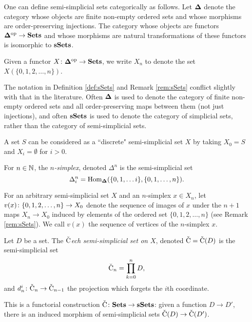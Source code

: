 \documentclass{amsart}
\def\Cech{$\check{\tn{C}}$ech }
\def\C{\check{\tn{C}}}
\begin{document}
\begin{remark}\label{rem:sSets}

One can define semi-simplicial sets categorically as follows.  Let $\bf{\Delta}$ denote the category whose objects are finite non-empty ordered sets and whose morphisms are order-preserving injections.  The category whose objects are functors $\bf{\Delta}^\textnormal{op}\rightarrow{\bf Sets}$ and whose morphisms are natural transformations of these functors is isomorphic to ${\bf sSets}$.

Given a functor $X\colon\bf{\Delta}^\textnormal{op}\rightarrow{\bf Sets}$, we write $X_n$ to denote the set $X(\{0,1,2,\ldots,n\})$.

\end{remark}

\begin{remark}

The notation in Definition \ref{def:sSets} and Remark \ref{rem:sSets} conflict slightly with that in the literature.  Often $\bf{\Delta}$ is used to denote the category of finite non-empty ordered sets and all order-preserving maps between them (not just injections), and often ${\bf sSets}$ is used to denote the category of simplicial sets, rather than the category of semi-simplicial sets.  

\end{remark}

\begin{example}\label{ex:sSets}

A set $S$ can be considered as a ``discrete" semi-simplicial set $X$ by taking $X_0=S$ and $X_i=\emptyset$ for $i>0$. 

For $n\in{\mathbb N}$, the {\em $n$-simplex}, denoted $\Delta^n$ is the semi-simplicial set $$\Delta^n_i=\textnormal{Hom}_{\bf{\Delta}}(\{0,1,\ldots i\},\{0,1,\ldots,n\}).$$

For an arbitrary semi-simplicial set $X$ and an $n$-simplex $x\in X_n$, let $v(x)\colon\{0,1,2,\ldots,n\}\rightarrow X_0$ denote the sequence of images of $x$ under the $n+1$ maps $X_n\to X_0$ induced by elements of the ordered set $\{0,1,2,\ldots,n\}$ (see Remark \ref{rem:sSets}).  We call $v(x)$ the sequence of vertices of the $n$-simplex $x$. 

\end{example}

\begin{definition}

Let $D$ be a set.  The {\em \Cech semi-simplicial set on $X$}, denoted $\C=\C(D)$ is the semi-simplicial set $$\C_n=\prod_{k=0}^n D,$$ and $d^i_n\taking\C_n\to\C_{n-1}$ the projection which forgets the $i$th coordinate.

This is a functorial construction $\C\taking\Sets\to\sSets$: given a function $D\to D'$, there is an induced morphism of semi-simplicial sets $\C(D)\to\C(D')$.

\end{definition}
\end{document}
